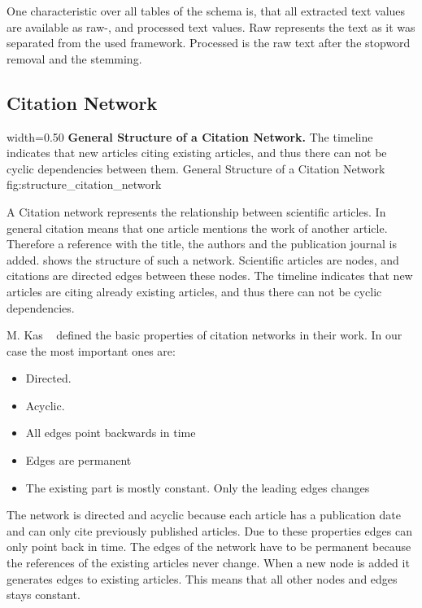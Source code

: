 One characteristic over all tables of the schema is, that all extracted text values are available as raw-, and processed text values. Raw represents the text as it was separated from the used framework. Processed is the raw text after the stopword removal and the stemming.

\subsection{Citation Network}
\label{sec:citation_network}

      {width=0.50\textwidth}
      {\textbf{General Structure of a Citation Network.} The timeline indicates that new articles citing existing articles, and thus there can not be cyclic dependencies between them.}
      {General Structure of a Citation Network}
      {fig:structure_citation_network}

A Citation network represents the relationship between scientific articles. In general citation means that one article mentions the work of another article. Therefore a
reference with the title, the authors and the publication journal is added.  shows the structure of such a network. Scientific articles are nodes, and citations are directed edges between these nodes. The timeline indicates that new articles are citing already existing articles, and thus there can not be cyclic dependencies.

M. Kas ~\cite{kas2011} defined the basic properties of citation networks in their work. In our case the most important ones are:

\begin{itemize}
  \item Directed.
  \item Acyclic.
  \item All edges point backwards in time
  \item Edges are permanent
  \item The existing part is mostly constant. Only the leading edges changes
\end{itemize}

The network is directed and acyclic because each article has a publication date and can only cite previously published articles. Due to these properties edges can only point back in time. The edges of the network have to be permanent because the references of the existing articles never change. When a new node is added it generates edges to existing articles. This means that all other nodes and edges stays constant.

